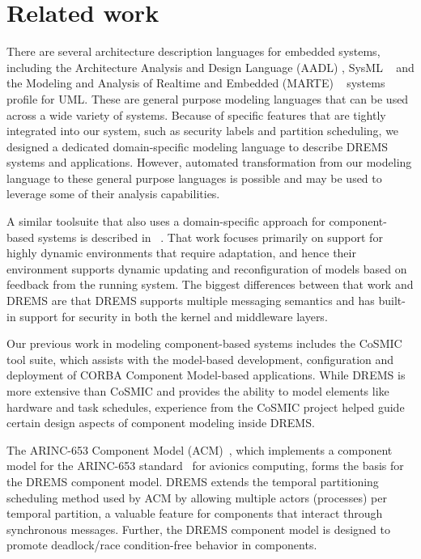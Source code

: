 \section{Related work}
\label{sec:rel_work}


There are several architecture description languages for embedded systems, including the Architecture Analysis and Design Language (AADL) \cite{AADL_Intro:06}, SysML ~\cite{SysML_v1.3:12} and the Modeling and Analysis of Realtime and Embedded (MARTE) ~\cite{MARTE_v1.1:11} systems profile for UML. These are general purpose modeling languages that can be used across a wide variety of systems. Because of specific features that are tightly integrated into our system, such as security labels and partition scheduling, we designed a dedicated domain-specific modeling language to describe DREMS systems and applications. However, automated transformation from our modeling language to these general purpose languages is possible and may be used to leverage some of their analysis capabilities.

A similar toolsuite that also uses a domain-specific approach for component-based systems is described in ~\cite{Metamodel_ECFMA:10}. That work focuses primarily on support for highly dynamic environments that require adaptation, and hence their environment supports dynamic updating and reconfiguration of models based on feedback from the running system. The biggest differences between that work and DREMS are that DREMS supports multiple messaging semantics and has built-in support for security in both the kernel and middleware layers.

Our previous work in modeling component-based systems includes the CoSMIC ~\cite{gokhale2008model, Schmidt:05e} tool suite, which assists with the model-based development, configuration and deployment of CORBA Component Model-based applications. While DREMS is more extensive than CoSMIC and provides the ability to model elements like hardware and task schedules, experience from the CoSMIC project helped guide certain design aspects of component modeling inside DREMS.

The ARINC-653 Component Model (ACM)~\cite{ACM_SPE:10}, which implements a component model for the ARINC-653 standard~\cite{ARINC-653} for avionics computing, forms the basis for the DREMS component model. DREMS extends the temporal partitioning scheduling method used by ACM by allowing multiple actors (processes) per temporal partition, a valuable feature for components that interact through synchronous messages. Further, the DREMS component model is designed to promote deadlock/race condition-free behavior in components.

